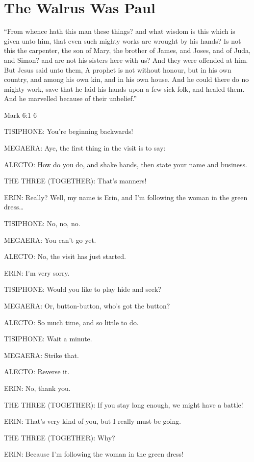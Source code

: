 \chapter{The Walrus Was Paul}

“From whence hath this man these things? and what wisdom is this which is given unto him, that even such mighty works are wrought by his hands? Is not this the carpenter, the son of Mary, the brother of James, and Joses, and of Juda, and Simon? and are not his sisters here with us? And they were offended at him. But Jesus said unto them, A prophet is not without honour, but in his own country, and among his own kin, and in his own house. And he could there do no mighty work, save that he laid his hands upon a few sick folk, and healed them. And he marvelled because of their unbelief.”

Mark 6:1-6

\simpleline

TISIPHONE: You’re beginning backwards!

MEGAERA: Aye, the first thing in the visit is to say:

ALECTO: How do you do, and shake hands, then state your name and business.

THE THREE (TOGETHER): That’s manners!

ERIN: Really? Well, my name is Erin, and I’m following the woman in the green dress…

TISIPHONE: No, no, no.

MEGAERA: You can’t go yet.

ALECTO: No, the visit has just started.

ERIN: I’m very sorry.

TISIPHONE: Would you like to play hide and seek?

MEGAERA: Or, button-button, who’s got the button?

ALECTO: So much time, and so little to do.

TISIPHONE: Wait a minute.

MEGAERA: Strike that.

ALECTO: Reverse it.

ERIN: No, thank you.

THE THREE (TOGETHER): If you stay long enough, we might have a battle!

ERIN: That’s very kind of you, but I really must be going.

THE THREE (TOGETHER): Why?

ERIN: Because I’m following the woman in the green dress!

